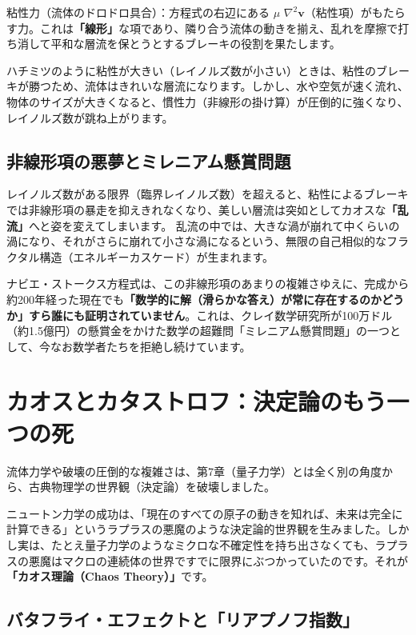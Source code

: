 粘性力（流体のドロドロ具合）：方程式の右辺にある \ensuremath{\mu} \ensuremath{\nabla^2\mathbf{v}}（粘性項）がもたらす力。これは\textbf{「線形」}な項であり、隣り合う流体の動きを揃え、乱れを摩擦で打ち消して平和な層流を保とうとするブレーキの役割を果たします。

ハチミツのように粘性が大きい（レイノルズ数が小さい）ときは、粘性のブレーキが勝つため、流体はきれいな層流になります。しかし、水や空気が速く流れ、物体のサイズが大きくなると、慣性力（非線形の掛け算）が圧倒的に強くなり、レイノルズ数が跳ね上がります。

\subsection{非線形項の悪夢とミレニアム懸賞問題}

レイノルズ数がある限界（臨界レイノルズ数）を超えると、粘性によるブレーキでは非線形項の暴走を抑えきれなくなり、美しい層流は突如としてカオスな\textbf{「乱流」}へと姿を変えてしまいます。 乱流の中では、大きな渦が崩れて中くらいの渦になり、それがさらに崩れて小さな渦になるという、無限の自己相似的なフラクタル構造（エネルギーカスケード）が生まれます。

ナビエ・ストークス方程式は、この非線形項のあまりの複雑さゆえに、完成から約200年経った現在でも\textbf{「数学的に解（滑らかな答え）が常に存在するのかどうか」すら誰にも証明されていません}。これは、クレイ数学研究所が100万ドル（約1.5億円）の懸賞金をかけた数学の超難問「ミレニアム懸賞問題」の一つとして、今なお数学者たちを拒絶し続けています。

\section{カオスとカタストロフ：決定論のもう一つの死}

流体力学や破壊の圧倒的な複雑さは、第7章（量子力学）とは全く別の角度から、古典物理学の世界観（決定論）を破壊しました。

ニュートン力学の成功は、「現在のすべての原子の動きを知れば、未来は完全に計算できる」というラプラスの悪魔のような決定論的世界観を生みました。しかし実は、たとえ量子力学のようなミクロな不確定性を持ち出さなくても、ラプラスの悪魔はマクロの連続体の世界ですでに限界にぶつかっていたのです。それが\textbf{「カオス理論（Chaos Theory）」}です。

\subsection{バタフライ・エフェクトと「リアプノフ指数」}

